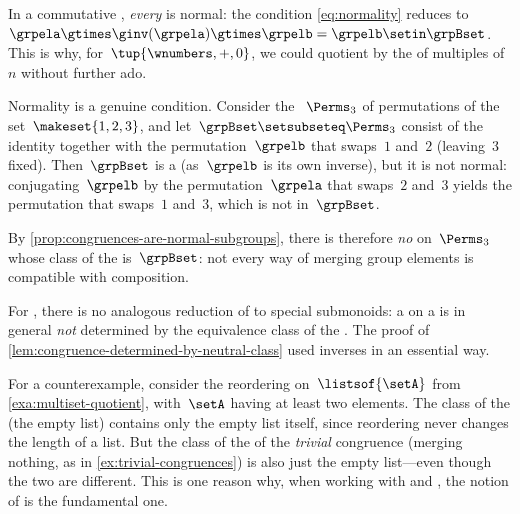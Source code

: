 \begin{example}
    In a commutative , \emph{every}  is normal: the condition \cref{eq:normality} reduces to~$\grpela \gtimes \ginv(\grpela) \gtimes \grpelb = \grpelb \setin \grpBset$.
    This is why, for~$\tup{\wnumbers, +, 0}$, we could quotient by the  of multiples of~$n$ without further ado.
\end{example}

\begin{example}
    \label{exa:non-normal-subgroup}
    Normality is a genuine condition.
    Consider the ~$\Perms_3$ of permutations of the set~$\makeset{1,2,3}$, and let~$\grpBset \setsubseteq \Perms_3$ consist of the identity together with the permutation~$\grpelb$ that swaps~$1$ and~$2$ (leaving~$3$ fixed).
    Then~$\grpBset$ is a  (as~$\grpelb$ is its own inverse), but it is not normal: conjugating~$\grpelb$ by the permutation~$\grpela$ that swaps~$2$ and~$3$ yields the permutation that swaps~$1$ and~$3$, which is not in~$\grpBset$.

    By \cref{prop:congruences-are-normal-subgroups}, there is therefore \emph{no}  on~$\Perms_3$ whose class of the  is~$\grpBset$: not every way of merging group elements is compatible with composition.
\end{example}

\begin{remark}
    \label{rem:no-normal-submonoids}
    For , there is no analogous reduction of  to special submonoids: a  on a  is in general \emph{not} determined by the equivalence class of the .
    The proof of \cref{lem:congruence-determined-by-neutral-class} used inverses in an essential way.

    For a counterexample, consider the reordering  on~$\listsof{\setA}$ from \cref{exa:multiset-quotient}, with~$\setA$ having at least two elements.
    The class of the  (the empty list) contains only the empty list itself, since reordering never changes the length of a list.
    But the class of the  of the \emph{trivial} congruence (merging nothing, as in \cref{ex:trivial-congruences}) is also just the empty list---even though the two  are different.
    This is one reason why, when working with  and , the notion of  is the fundamental one.
\end{remark}
